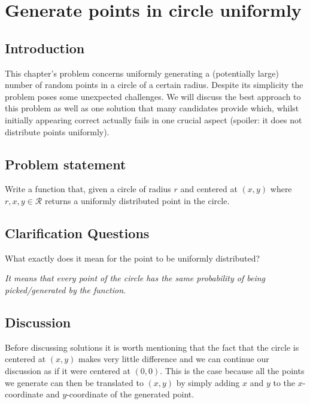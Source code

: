 %

\chapter{Generate points in circle uniformly}
\label{ch:random_points_in_circle}
\section*{Introduction}
This chapter's problem concerns uniformly generating a (potentially large) number of random points in a circle of a certain radius. Despite its simplicity the problem poses some unexpected challenges. We will discuss the best approach to this problem as well as one solution that many candidates provide which, whilst initially appearing correct actually fails in one crucial aspect (spoiler: it does not distribute points uniformly). 

\section{Problem statement}
\begin{exercise}
Write a function that, given a circle of radius $r$ and centered at $(x,y)$ where $r,x,y \in \mathcal{R}$ returns a uniformly distributed point in the circle.
\end{exercise}


\section{Clarification Questions}

\begin{QandA}
	\begin{questionitem} \begin{question} What exactly does it mean for the point to be uniformly distributed?  \end{question} 	 
    \begin{answered}
		\textit{It means that every point of the circle has the same probability of being picked/generated by the function}.
	\end{answered} \end{questionitem}
\end{QandA}

\section{Discussion}
\label{random_points_in_circle:sec:discussion}
Before discussing solutions it is worth mentioning that the fact that the circle is centered at $(x,y)$ makes very little difference and we can continue our discussion as if it were centered at $(0,0)$. This is the case because all the points we generate can then be translated to $(x,y)$ by simply adding $x$ and $y$ to the $x$-coordinate and $y$-coordinate of the generated point.


